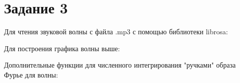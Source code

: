 \section{Задание 3}

Для чтения звуковой волны с файла .mp3 с помощью библиотеки librosa:


Для построения графика волны выше: 


Дополнительные функции для численного интегрирования "ручками" образа Фурье для волны:



\endinput